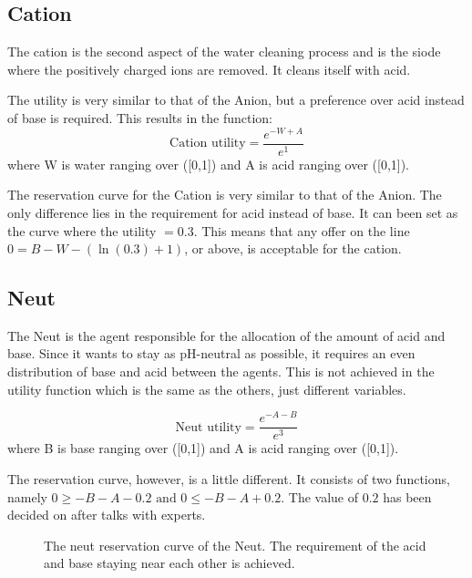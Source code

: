 \subsection{Cation}
The cation is the second aspect of the water cleaning process and is the siode where the positively charged ions are removed. It cleans itself with acid. %

The utility is very similar to that of the Anion, but a preference over acid instead of base is required. This results in the function:
\[
\text{Cation utility} = \frac{e^{-W+A}}{e^1}
\] 
where W is water ranging over ([0,1]) and A is acid ranging over ([0,1]).

The reservation curve for the Cation is very similar to that of the Anion. The only difference lies in the requirement for acid instead of base. It can been set as the curve where the utility $= 0.3$. This means that any offer on the line $0 = B - W - (\ln(0.3)+1)$, or above, is acceptable for the cation.

\subsection{Neut}
The Neut is the agent responsible for the allocation of the amount of acid and base. Since it wants to stay as pH-neutral as possible, it requires an even distribution of base and acid between the agents. This is not achieved in the utility function which is the same as the others, just different variables.

\[
\text{Neut utility} = \frac{e^{-A-B}}{e^3}
\] 
where B is base ranging over ([0,1]) and A is acid ranging over ([0,1]).

The reservation curve, however, is a little different. It consists of two functions, namely $0 \geq -B - A - 0.2 \text{ and }  0 \leq -B - A + 0.2$. The value of $0.2$ has been decided on after talks with experts. 

\begin{figure}[h]
		\centering
			\caption{The neut reservation curve of the Neut. The requirement of the acid and base staying near each other is achieved.}
			\label{fig:neutreservationcurve}
	\end{figure}
\clearpage
